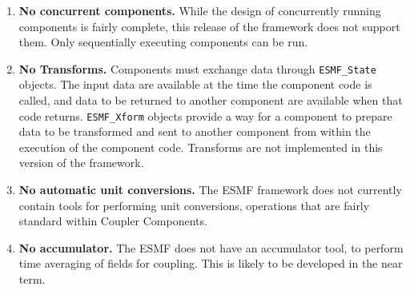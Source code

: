 %


\begin{enumerate}

\item {\bf No concurrent components.}  While the design of concurrently 
running components is fairly complete, this release of the framework 
does not support them.  Only sequentially executing components can be run.

\item {\bf No Transforms.}  Components must exchange data through 
{\tt ESMF\_State} objects.  The input data are available at the time 
the component code is called, and data to be returned to another 
component are available
when that code returns.  {\tt ESMF\_Xform} objects provide a way for
a component to prepare data to be transformed and sent to another 
component from within the execution of the component code.
Transforms are not implemented in this version of the framework.

\item {\bf No automatic unit conversions.}  The ESMF framework does not 
currently contain tools for performing unit conversions, operations that 
are fairly standard within Coupler Components.

\item {\bf No accumulator.}  The ESMF does not have an accumulator tool, to
perform time averaging of fields for coupling.  This is likely to be developed
in the near term.

\end{enumerate}
